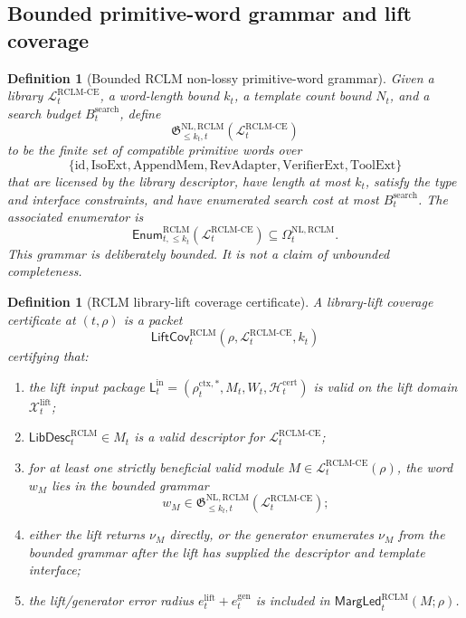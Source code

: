 \documentclass[11pt,a4paper]{article}
\newtheorem{definition}[theorem]{Definition}
\newcommand{\Lcal}{\mathcal L}
\newcommand{\Xcal}{\mathcal X}
\newcommand{\id}{\mathrm{id}}
\newcommand{\RCLM}{\mathrm{RCLM}}
\newcommand{\ctx}{\mathrm{ctx}}
\newcommand{\search}{\mathrm{search}}
\newcommand{\cert}{\mathrm{cert}}
\newcommand{\NL}{\mathrm{NL}}
\newcommand{\IsoExt}{\mathrm{IsoExt}}
\newcommand{\AppendMem}{\mathrm{AppendMem}}
\newcommand{\RevAdapter}{\mathrm{RevAdapter}}
\newcommand{\VerifierExt}{\mathrm{VerifierExt}}
\newcommand{\ToolExt}{\mathrm{ToolExt}}
\newcommand{\CE}{\mathrm{CE}}
\begin{document}
\subsection{Bounded primitive-word grammar and lift coverage}

\begin{definition}[Bounded RCLM non-lossy primitive-word grammar]
\label{def:rclm-batch11-bounded-grammar}
Given a library \(\Lcal_t^{\RCLM\text{-}\CE}\), a word-length bound \(k_t\), a template count bound \(N_t\), and a search budget \(B_t^{\search}\), define
\[
\mathfrak G_{\le k_t,t}^{\NL,\RCLM}(\Lcal_t^{\RCLM\text{-}\CE})
\]
to be the finite set of compatible primitive words over
\[
\{\id,\IsoExt,\AppendMem,\RevAdapter,\VerifierExt,\ToolExt\}
\]
that are licensed by the library descriptor, have length at most \(k_t\), satisfy the type and interface constraints, and have enumerated search cost at most \(B_t^{\search}\).  The associated enumerator is
\[
\mathsf{Enum}_{t,\le k_t}^{\RCLM}(\Lcal_t^{\RCLM\text{-}\CE})
\subseteq
\Omega_t^{\NL,\RCLM}.
\]
This grammar is deliberately bounded.  It is not a claim of unbounded completeness.
\end{definition}

\begin{definition}[RCLM library-lift coverage certificate]
\label{def:rclm-batch11-lift-coverage-certificate}
A library-lift coverage certificate at \((t,\rho)\) is a packet
\[
\mathsf{LiftCov}_t^{\RCLM}(\rho,\Lcal_t^{\RCLM\text{-}\CE},k_t)
\]
certifying that:
\begin{enumerate}[label=(\roman*),leftmargin=1.5em]
    \item the lift input package \(\mathsf L_t^{\mathrm{in}}=(\rho_t^{\ctx,*},M_t,W_t,\mathcal H_t^{\cert})\) is valid on the lift domain \(\Xcal_t^{\mathrm{lift}}\);
    \item \(\mathsf{LibDesc}_t^{\RCLM}\in M_t\) is a valid descriptor for \(\Lcal_t^{\RCLM\text{-}\CE}\);
    \item for at least one strictly beneficial valid module \(M\in\Lcal_t^{\RCLM\text{-}\CE}(\rho)\), the word \(w_M\) lies in the bounded grammar
    \[
    w_M\in\mathfrak G_{\le k_t,t}^{\NL,\RCLM}(\Lcal_t^{\RCLM\text{-}\CE});
    \]
    \item either the lift returns \(\nu_M\) directly, or the generator enumerates \(\nu_M\) from the bounded grammar after the lift has supplied the descriptor and template interface;
    \item the lift/generator error radius \(e_t^{\mathrm{lift}}+e_t^{\mathrm{gen}}\) is included in \(\mathsf{MargLed}_t^{\RCLM}(M;\rho)\).
\end{enumerate}
\end{definition}
\end{document}
